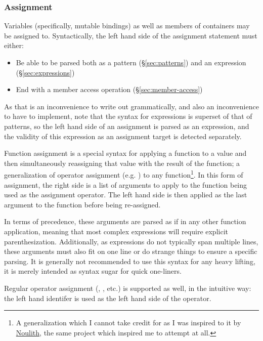\subsubsection{Assignment}

Variables (specifically, mutable bindings) as well as members of containers
may be assigned to. Syntactically, the left hand side of the assignment
statement must either:

\begin{itemize}
    \item Be able to be parsed both as a pattern (\S\ref{sec:patterns}) and an expression (\S\ref{sec:expressions})
    \item End with a member access operation (\S\ref{sec:member-access})
\end{itemize}

As that is an inconvenience to write out grammatically, and also an inconvenience
to have to implement, note that the syntax for expressions is superset of that
of patterns, so the left hand side of an assignment is parsed as an expression, and
the validity of this expression as an assignment target is detected separately.

Function assignment is a special syntax for applying a function to a value and
then simultaneously reassigning that value with the result of the function; a
generalization of operator assignment (e.g. \op{+=}) to any function\footnote{A
generalization which I cannot take credit for as I was inspired to it by
\href{https://github.com/betaveros/noulith}{Noulith}, the same project
which inspired me to attempt \Trilogy{} at all.}. In this form of assignment,
the right side is a list of arguments to apply to the function being used as
the assignment operator. The left hand side is then applied as the last argument
to the function before being re-assigned.

In terms of precedence, these arguments are parsed as if in any other function
application, meaning that most complex expressions will require explicit
parenthesization. Additionally, as expressions do not typically span multiple lines,
these arguments must also fit on one line or do strange things to ensure a specific
parsing. It is generally not recommended to use this syntax for any heavy lifting, it
is merely intended as syntax sugar for quick one-liners.

Regular operator assignment (\op{+=}, \op{-=}, etc.) is supported as well, in the
intuitive way: the left hand identifer is used as the left hand side of the operator.

